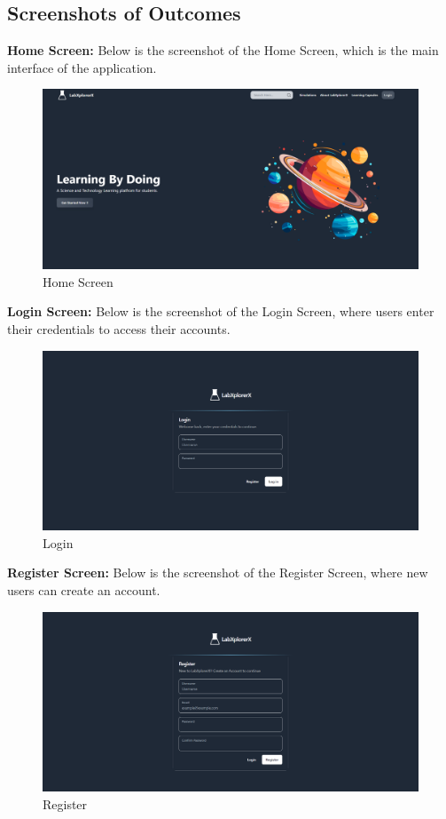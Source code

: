 \subsection{Screenshots of Outcomes}
\textbf{Home Screen:} Below is the screenshot of the Home Screen, which is the main interface of the application.
\begin{figure}[H]
    \centering
    \includegraphics[width = 14cm]{Diagrams/output/home.png}
    \caption{Home Screen}
\end{figure}

\textbf{Login Screen:} Below is the screenshot of the Login Screen, where users enter their credentials to access their accounts.
\begin{figure}[H]
    \centering
    \includegraphics[width = 15cm]{Diagrams/output/login.png}
    \caption{Login}
\end{figure}
\newpage
\textbf{Register Screen:} Below is the screenshot of the Register Screen, where new users can create an account.
\begin{figure}[H]
    \centering
    \includegraphics[width = 16cm]{Diagrams/output/register.png}
    \caption{Register}
\end{figure}

